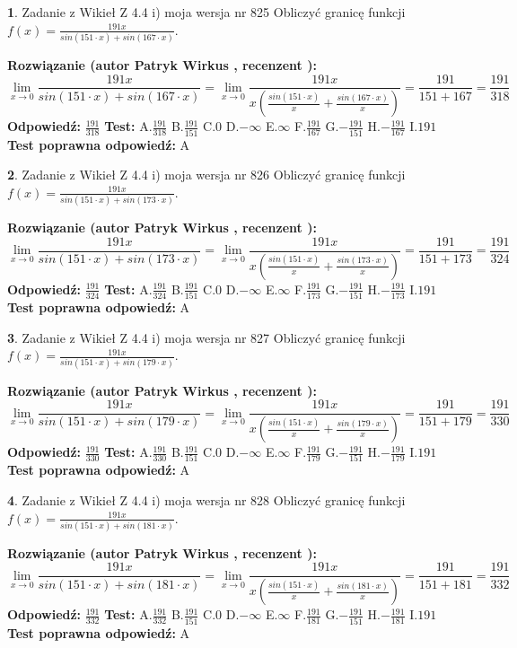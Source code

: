 \documentclass[12pt, a4paper]{article}
\theoremstyle{definition} %
\newtheorem{zad}{}
\newcommand{\zadStart}[1]{\begin{zad}#1\newline}
\newcommand{\zadStop}{\end{zad}}
\newcommand{\rozwStart}[2]{\noindent \textbf{Rozwiązanie (autor #1 , recenzent #2): }\newline}
\newcommand{\rozwStop}{\newline}
\newcommand{\odpStart}{\noindent \textbf{Odpowiedź:}\newline}
\newcommand{\odpStop}{\newline}
\newcommand{\testStart}{\noindent \textbf{Test:}\newline}
\newcommand{\testStop}{\newline}
\newcommand{\kluczStart}{\noindent \textbf{Test poprawna odpowiedź:}\newline}
\newcommand{\kluczStop}{\newline}
\begin{document}
\zadStart{Zadanie z Wikieł Z 4.4 i) moja wersja nr 825}
Obliczyć granicę funkcji $f(x)=\frac{191x}{sin(151\cdot x) +sin(167\cdot x)}$.
\zadStop
\rozwStart{Patryk Wirkus}{}
$$\lim\limits_{x\to 0}\frac{191x}{sin(151\cdot x) +sin(167\cdot x)}=\lim\limits_{x\to 0}\frac{191x}{x(\frac{sin(151\cdot x)}{x}+\frac{sin(167\cdot x)}{x})}=\frac{191}{151+167} = \frac{191}{318}$$
\rozwStop
\odpStart
$\frac{191}{318}$
\odpStop
\testStart
A.$\frac{191}{318}$
B.$\frac{191}{151}$
C.$0$
D.$-\infty$
E.$\infty$
F.$\frac{191}{167}$
G.$-\frac{191}{151}$
H.$-\frac{191}{167}$
I.$191$
\testStop
\kluczStart
A
\kluczStop



\zadStart{Zadanie z Wikieł Z 4.4 i) moja wersja nr 826}
Obliczyć granicę funkcji $f(x)=\frac{191x}{sin(151\cdot x) +sin(173\cdot x)}$.
\zadStop
\rozwStart{Patryk Wirkus}{}
$$\lim\limits_{x\to 0}\frac{191x}{sin(151\cdot x) +sin(173\cdot x)}=\lim\limits_{x\to 0}\frac{191x}{x(\frac{sin(151\cdot x)}{x}+\frac{sin(173\cdot x)}{x})}=\frac{191}{151+173} = \frac{191}{324}$$
\rozwStop
\odpStart
$\frac{191}{324}$
\odpStop
\testStart
A.$\frac{191}{324}$
B.$\frac{191}{151}$
C.$0$
D.$-\infty$
E.$\infty$
F.$\frac{191}{173}$
G.$-\frac{191}{151}$
H.$-\frac{191}{173}$
I.$191$
\testStop
\kluczStart
A
\kluczStop



\zadStart{Zadanie z Wikieł Z 4.4 i) moja wersja nr 827}
Obliczyć granicę funkcji $f(x)=\frac{191x}{sin(151\cdot x) +sin(179\cdot x)}$.
\zadStop
\rozwStart{Patryk Wirkus}{}
$$\lim\limits_{x\to 0}\frac{191x}{sin(151\cdot x) +sin(179\cdot x)}=\lim\limits_{x\to 0}\frac{191x}{x(\frac{sin(151\cdot x)}{x}+\frac{sin(179\cdot x)}{x})}=\frac{191}{151+179} = \frac{191}{330}$$
\rozwStop
\odpStart
$\frac{191}{330}$
\odpStop
\testStart
A.$\frac{191}{330}$
B.$\frac{191}{151}$
C.$0$
D.$-\infty$
E.$\infty$
F.$\frac{191}{179}$
G.$-\frac{191}{151}$
H.$-\frac{191}{179}$
I.$191$
\testStop
\kluczStart
A
\kluczStop



\zadStart{Zadanie z Wikieł Z 4.4 i) moja wersja nr 828}
Obliczyć granicę funkcji $f(x)=\frac{191x}{sin(151\cdot x) +sin(181\cdot x)}$.
\zadStop
\rozwStart{Patryk Wirkus}{}
$$\lim\limits_{x\to 0}\frac{191x}{sin(151\cdot x) +sin(181\cdot x)}=\lim\limits_{x\to 0}\frac{191x}{x(\frac{sin(151\cdot x)}{x}+\frac{sin(181\cdot x)}{x})}=\frac{191}{151+181} = \frac{191}{332}$$
\rozwStop
\odpStart
$\frac{191}{332}$
\odpStop
\testStart
A.$\frac{191}{332}$
B.$\frac{191}{151}$
C.$0$
D.$-\infty$
E.$\infty$
F.$\frac{191}{181}$
G.$-\frac{191}{151}$
H.$-\frac{191}{181}$
I.$191$
\testStop
\kluczStart
A
\kluczStop
\end{document}
